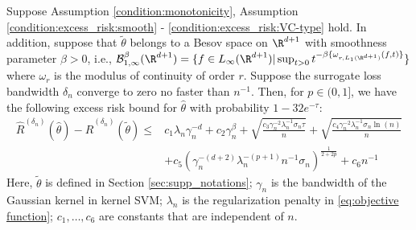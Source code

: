 \begin{lemma}\label{lemma:svm_estimation_error}
    Suppose Assumption \ref{condition:monotonicity}, Assumption \ref{condition:excess_risk:smooth} - \ref{condition:excess_risk:VC-type} hold. In addition, suppose that $\tilde\theta$ belongs to a Besov space on $\R^{d+1}$ with smoothness parameter $\beta>0$, i.e., $\mathcal{B}_{1,\infty}^\beta(\R^{d+1}) = \{f\in L_\infty(\R^{d+1})|\sup_{t>0}t^{-\beta\{\omega_{r,L_1(\R^{d+1})}(f,t)\}}\}$ where $\omega_r$ is the modulus of continuity of order $r$. Suppose the surrogate loss bandwidth $\delta_n$ converge to zero no faster than $n^{-1}$. Then, for $p\in(0,1]$, we have the following excess risk bound for $\widehat\theta$ with probability $1-32e^{-\tau}$:
   \begin{align*}
   \widehat R^{({\delta_n})}(\widehat\theta) - \widehat R^{({\delta_n})}(\tilde\theta)\leq & c_1 \lambda_n\gamma_n^{-d} + c_2\gamma_n^{\beta}+ \sqrt{\frac{ c_3\gamma_n^{-2}\lambda_n^{-1}\sigma_n\tau}{n}} + \sqrt{\frac{ c_4\gamma_n^{-2}\lambda_n^{-1}\sigma_n\ln(n)}{n}} \\
   & + c_5\left(\gamma_n^{-(d+2)}\lambda_n^{-(p+1)}n^{-1}\sigma_n\right)^{\frac{1}{2+2p}} + c_6n^{-1}
\end{align*}
Here, $\tilde\theta$ is defined in Section \ref{sec:supp_notations}; $\gamma_n$ is the bandwidth of the Gaussian kernel in kernel SVM; $\lambda_n$ is the regularization penalty in \eqref{eq:objective function}; $c_1,\ldots,c_6$ are constants that are independent of $n$.    
\end{lemma}

